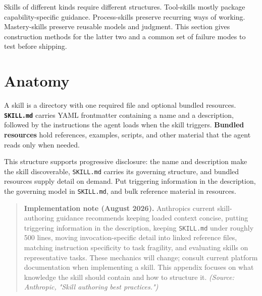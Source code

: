 

Skills of different kinds require different structures. Tool-skills mostly package capability-specific guidance. Process-skills preserve recurring ways of working. Mastery-skills preserve reusable models and judgment. This section gives construction methods for the latter two and a common set of failure modes to test before shipping.

\section{Anatomy}\label{heading:anatomy}


A skill is a directory with one required file and optional bundled resources. \textbf{\texttt{SKILL.md}} carries YAML frontmatter containing a name and a description, followed by the instructions the agent loads when the skill triggers. \textbf{Bundled resources} hold references, examples, scripts, and other material that the agent reads only when needed.

This structure supports progressive disclosure: the name and description make the skill discoverable, \texttt{SKILL.md} carries its governing structure, and bundled resources supply detail on demand. Put triggering information in the description, the governing model in \texttt{SKILL.md}, and bulk reference material in resources.

\begin{quote}
\textbf{Implementation note (August 2026).} Anthropic\textquotesingle s current skill-authoring guidance recommends keeping loaded context concise, putting triggering information in the description, keeping \texttt{SKILL.md} under roughly 500 lines, moving invocation-specific detail into linked reference files, matching instruction specificity to task fragility, and evaluating skills on representative tasks. These mechanics will change; consult current platform documentation when implementing a skill. This appendix focuses on what knowledge the skill should contain and how to structure it. \emph{(Source: Anthropic, "Skill authoring best practices.")}
\end{quote}

